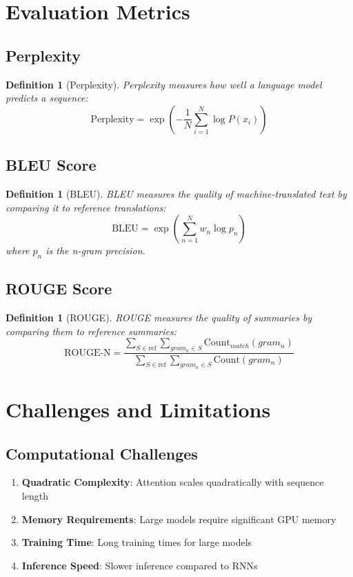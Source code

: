 \documentclass[11pt,a4paper]{article}
\newtheorem{definition}[theorem]{Definition}
\begin{document}
\section{Evaluation Metrics}

\subsection{Perplexity}

\begin{definition}[Perplexity]
Perplexity measures how well a language model predicts a sequence:
$$\text{Perplexity} = \exp\left(-\frac{1}{N}\sum_{i=1}^{N} \log P(x_i)\right)$$
\end{definition}

\subsection{BLEU Score}

\begin{definition}[BLEU]
BLEU measures the quality of machine-translated text by comparing it to reference translations:
$$\text{BLEU} = \exp\left(\sum_{n=1}^{N} w_n \log p_n\right)$$
where $p_n$ is the n-gram precision.
\end{definition}

\subsection{ROUGE Score}

\begin{definition}[ROUGE]
ROUGE measures the quality of summaries by comparing them to reference summaries:
$$\text{ROUGE-N} = \frac{\sum_{S \in \text{ref}} \sum_{gram_n \in S} \text{Count}_{match}(gram_n)}{\sum_{S \in \text{ref}} \sum_{gram_n \in S} \text{Count}(gram_n)}$$
\end{definition}

\section{Challenges and Limitations}

\subsection{Computational Challenges}

\begin{enumerate}
\item \textbf{Quadratic Complexity}: Attention scales quadratically with sequence length
\item \textbf{Memory Requirements}: Large models require significant GPU memory
\item \textbf{Training Time}: Long training times for large models
\item \textbf{Inference Speed}: Slower inference compared to RNNs
\end{enumerate}
\end{document}
